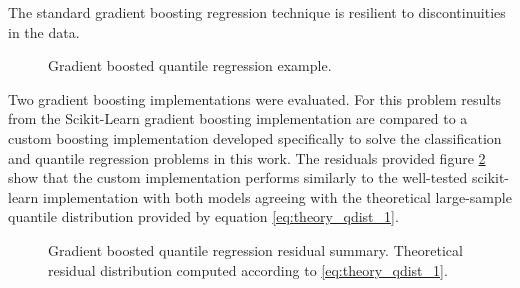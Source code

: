 

The standard gradient boosting regression technique is resilient to discontinuities in the data.  


\begin{figure}[H]%
    \centering
    \qquad
    \qquad
    \qquad
    \qquad
    \caption[Gradient boosted quantile regression example.]{Gradient boosted quantile regression example.}%
    \label{fig:gb1}%
\end{figure}

Two gradient boosting implementations were evaluated.  For this problem results from the Scikit-Learn gradient boosting implementation are compared to a custom boosting implementation developed specifically to solve the classification and quantile regression problems in this work.  The residuals provided figure \ref{fig:gb2} show that the custom implementation performs similarly to the well-tested scikit-learn implementation with both models agreeing with the theoretical large-sample quantile distribution provided by equation \ref{eq:theory_qdist_1}.

\begin{figure}[H]%
    \centering
    \qquad
    \qquad
    \qquad
    \qquad
    \caption[Gradient boosted quantile regression residual summary.]{Gradient boosted quantile regression residual summary.  Theoretical residual distribution computed according to \ref{eq:theory_qdist_1}.} %
    \label{fig:gb2}%
\end{figure}

